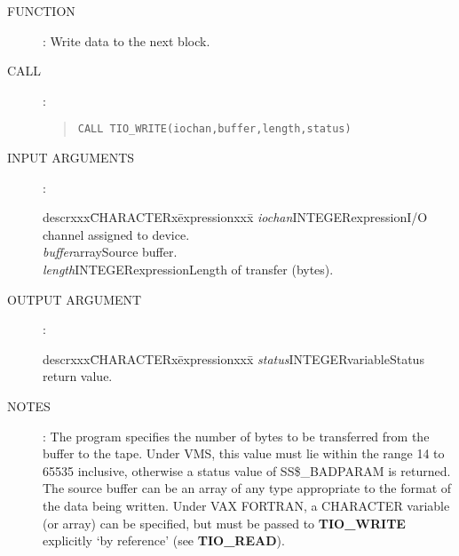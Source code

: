 \begin{description}
\item [FUNCTION]:
Write data to the next block.
\item [CALL]:
\begin{quote}
{\tt CALL TIO\_WRITE(iochan,buffer,length,status)}
\end{quote}
\item [INPUT ARGUMENTS]:
\begin{tabbing}
descrxxx\=CHARACTERx\=expressionxxx\=\kill
{\em iochan}\>INTEGER\>expression\>I/O channel assigned to device.\\
{\em buffer}\>\>array\>Source buffer.\\
{\em length}\>INTEGER\>expression\>Length of transfer (bytes).
\end{tabbing}
\item [OUTPUT ARGUMENT]:
\begin{tabbing}
descrxxx\=CHARACTERx\=expressionxxx\=\kill
{\em status}\>INTEGER\>variable\>Status return value.
\end{tabbing}
\item [NOTES]:
The program specifies the number of bytes to be transferred from the
buffer to the tape.
Under VMS, this value must lie within the range 14 to 65535 inclusive, otherwise
a status value of SS\$\_BADPARAM is returned.
The source buffer can be an array of any type appropriate to the format of the
data being written.
Under VAX FORTRAN, a CHARACTER variable (or array) can be specified, but must be
passed to {\bf TIO\_WRITE} explicitly `by reference' (see {\bf TIO\_READ}).
\end{description}

                                                                                                                                                                                                                                                                                                                                                                                                                                                                                                                                                                                                 